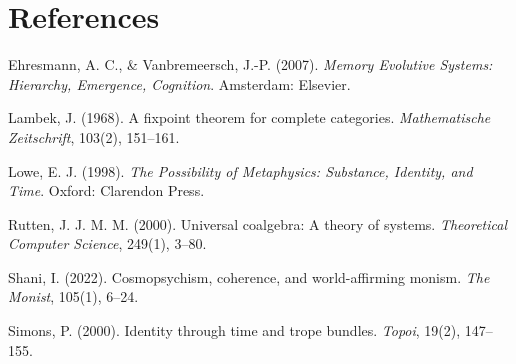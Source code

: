 \documentclass[11pt,oneside]{report}
\theoremstyle{definition}
\theoremstyle{remark}
\newenvironment{reflist}
  {\par\small\setlength{\parindent}{0pt}%
   \setlength{\leftskip}{1.6em}\setlength{\parindent}{-1.6em}%
   \setlength{\parskip}{0.4em}%
   \raggedright\hyphenpenalty=50\exhyphenpenalty=50\relax
   \sloppy}
  {\par}
\begin{document}
\section*{References}


\begin{reflist}
Ehresmann, A. C., \& Vanbremeersch, J.-P. (2007). \emph{Memory Evolutive Systems: Hierarchy, Emergence, Cognition}. Amsterdam: Elsevier.

Lambek, J. (1968). A fixpoint theorem for complete categories. \emph{Mathematische Zeitschrift}, 103(2), 151--161.

Lowe, E. J. (1998). \emph{The Possibility of Metaphysics: Substance, Identity, and Time}. Oxford: Clarendon Press.

Rutten, J. J. M. M. (2000). Universal coalgebra: A theory of systems. \emph{Theoretical Computer Science}, 249(1), 3--80.

Shani, I. (2022). Cosmopsychism, coherence, and world-affirming monism. \emph{The Monist}, 105(1), 6--24.

Simons, P. (2000). Identity through time and trope bundles. \emph{Topoi}, 19(2), 147--155.
\end{reflist}
\end{document}
